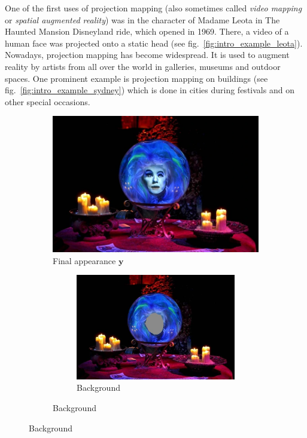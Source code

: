 One of the first uses of projection mapping (also sometimes called \textit{video mapping} or \textit{spatial augmented reality}) was in the character of Madame Leota in The Haunted Mansion Disneyland ride, which opened in 1969. There, a video of a human face was projected onto a static head (see fig.~\ref{fig:intro_example_leota}). Nowadays, projection mapping has become widespread. It is used to augment reality by artists from all over the world in galleries, museums and outdoor spaces. One prominent example is projection mapping on buildings (see fig.~\ref{fig:intro_example_sydney}) which is done in cities during festivals and on other special occasions.

\begin{figure}
    \centering
    \begin{subfigure}{0.6\textwidth}
        \centering
        \includegraphics[width=\textwidth]{images/01-Leota.jpg}
        \caption{Final appearance \(\bm{y}\)}
        \label{fig:intro_example_leota-full}
    \end{subfigure}
    \hfill
    \begin{subfigure}{0.39\textwidth}
        \centering
        \begin{subfigure}{\textwidth}
            \centering
            \includegraphics[width=\textwidth]{images/01-Leota-no_head.jpg}
            \caption{Background}
            \label{fig:intro_example_leota-scene}
        \end{subfigure}
        

\end{subfigure}
\end{figure}
